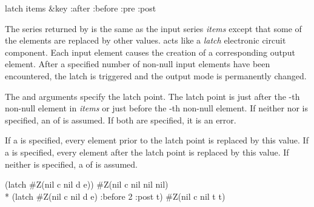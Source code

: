 \begin{defun}[Function]
latch items &key :after :before :pre :post

The series returned by  is the same as the input series
{\it items} except that some of the elements are replaced by other
values.   acts like a {\it latch} electronic circuit
component.  Each input element causes the creation of a corresponding
output element.  After a specified number of non-null input elements
have been encountered, the latch is triggered and the output mode is
permanently changed.

The  and  arguments specify the latch point.
The latch point is just after the -th non-null element in
{\it items} or just before the -th non-null element.  If
neither  nor  is specified, an 
of  is assumed.  If both are specified, it is an error.

If a  is specified, every element prior to the latch point
is replaced by this value.  If a  is specified, every element
after the latch point is replaced by this value.  If neither is
specified, a  of  is assumed.
\begin{lisp}
(latch \#Z(nil c nil d e)) {\EV} \#Z(nil c nil nil nil) \\*
(latch \#Z(nil c nil d e) :before 2 :post t) {\EV} \#Z(nil c nil t t)
\end{lisp}
\end{defun}

